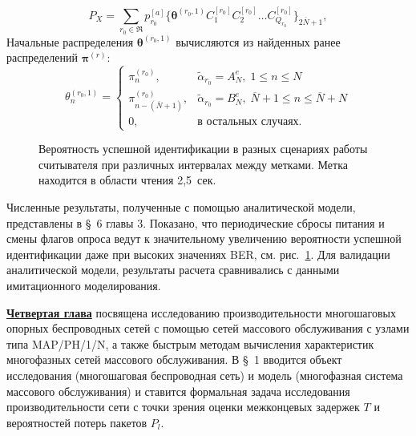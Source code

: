 $$
	P_X = \sum\limits_{r_0 \in \mathfrak{R}} p_{r_0}^{[a]} \{ \bm{\theta}^{(r_0,1)} C_1^{[r_0]} C_2^{[r_0]} \dots C_{Q_{r_0}}^{[r_0]} \}_{2\overline{N}+1},
$$
Начальные распределения $\bm{\theta}^{(r_0,1)}$ вычисляются из найденных ранее распределений $\bm{\pi}^{(r)}$:
$$
  \theta_n^{(r_0,1)} = \begin{cases}
    \pi^{(r_0)}_n,                      &\widetilde{\alpha}_{r_0} = A^e_N,\; 1 \leqslant n \leqslant N\\
    \pi^{(r_0)}_{n - (\overline{N}+1)}, &\widetilde{\alpha}_{r_0} = B^e_N,\; \overline{N}+1 \leqslant n \leqslant \overline{N}+N\\
    0,                                  &\text{в остальных случаях.}
  \end{cases}
$$

\begin{figure}[ht!]
  \caption{Вероятность успешной идентификации в разных сценариях работы считывателя при различных интервалах между метками. Метка находится в области чтения 2,5~сек.}\label{fig:id_prob_var_scenario}
\end{figure}

Численные результаты, полученные с помощью аналитической модели, представлены в \S~6 главы 3. Показано, что периодические сбросы питания и смены флагов опроса ведут к значительному увеличению вероятности успешной идентификации даже при высоких значениях BER, см. рис.~\ref{fig:id_prob_var_scenario}. Для валидации аналитической модели, результаты расчета сравнивались с данными имитационного моделирования.



\underline{\textbf{Четвертая глава}}
посвящена исследованию производительности многошаговых опорных беспроводных сетей с помощью сетей массового обслуживания с узлами типа MAP/PH/1/N, а также быстрым методам вычисления характеристик многофазных сетей массового обслуживания. В \S~1 вводится объект исследования (многошаговая беспроводная сеть) и модель (многофазная система массового обслуживания) и ставится формальная задача исследования производительности сети с точки зрения оценки межконцевых задержек $T$ и вероятностей потерь пакетов $P_l$.

